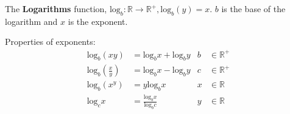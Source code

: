 The \textbf{Logarithms} function, $\text{log}_b: \mathbb{R} \rightarrow \mathbb{R}^+, \text{log}_b(y) = x$.
$b$ is the base of the logarithm and $x$ is the exponent.

Properties of exponents:
\begin{align*}
  \text{log}_b(xy)          & = \text{log}_bx + \text{log}_by       & b & \in \mathbb{R}^+ \\
  \text{log}_b(\frac{x}{y}) & = \text{log}_bx - \text{log}_by       & c & \in \mathbb{R}^+ \\
  \text{log}_b(x^y)         & = y\text{log}_bx                      & x & \in \mathbb{R}   \\
  \text{log}_cx             & = \frac{\text{log}_bx}{\text{log}_bc} & y & \in \mathbb{R}
\end{align*}
